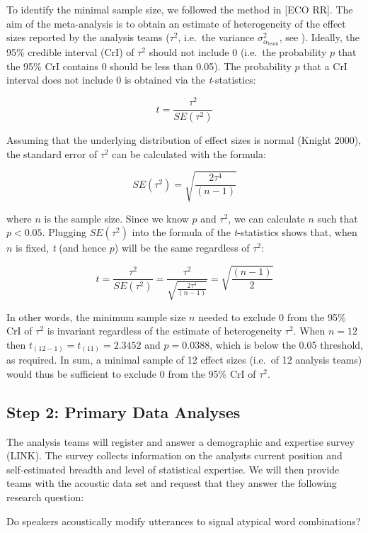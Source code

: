 \documentclass[
  english,
  man]{apa6}
\begin{document}
To identify the minimal sample size, we followed the method in {[}ECO RR{]}.
The aim of the meta-analysis is to obtain an estimate of heterogeneity of the effect sizes reported by the analysis teams (\(\tau^2\), i.e.~the variance \(\sigma^2_{\alpha_{\text{team}}}\), see ).
Ideally, the 95\% credible interval (CrI) of \(\tau^2\) should not include 0 (i.e.~the probability \(p\) that the 95\% CrI contains 0 should be less than 0.05).
The probability \(p\) that a CrI interval does not include 0 is obtained via the \emph{t}-statistics:

\[t = \frac{\tau^2}{SE(\tau^2)}\]

Assuming that the underlying distribution of effect sizes is normal (Knight 2000), the standard error of \(\tau^2\) can be calculated with the formula:

\[SE(\tau^2) = \sqrt{\frac{2\tau^4}{(n-1)}}\]

where \(n\) is the sample size.
Since we know \(p\) and \(\tau^2\), we can calculate \(n\) such that \(p < 0.05\).
Plugging \(SE(\tau^2)\) into the formula of the \emph{t}-statistics shows that, when \(n\) is fixed, \emph{t} (and hence \(p\)) will be the same regardless of \(\tau^2\):

\[t = \frac{\tau^2}{SE(\tau^2)} = \frac{\tau^2}{\sqrt{\frac{2\tau^4}{(n-1)}}} = \sqrt{\frac{(n-1)}{2}}\]

In other words, the minimum sample size \(n\) needed to exclude 0 from the 95\% CrI of \(\tau^2\) is invariant regardless of the estimate of heterogeneity \(\tau^2\).
When \(n = 12\) then \(t_{(12-1)} = t_{(11)} = 2.3452\) and \(p = 0.0388\), which is below the 0.05 threshold, as required.
In sum, a minimal sample of 12 effect sizes (i.e.~of 12 analysis teams) would thus be sufficient to exclude 0 from the 95\% CrI of \(\tau^2\).

\hypertarget{step-2-primary-data-analyses}{%
\subsection{Step 2: Primary Data Analyses}\label{step-2-primary-data-analyses}}

The analysis teams will register and answer a demographic and expertise survey (LINK).
The survey collects information on the analysts current position and self-estimated breadth and level of statistical expertise.
We will then provide teams with the acoustic data set and request that they answer the following research question:

Do speakers acoustically modify utterances to signal atypical word combinations?
\end{document}
